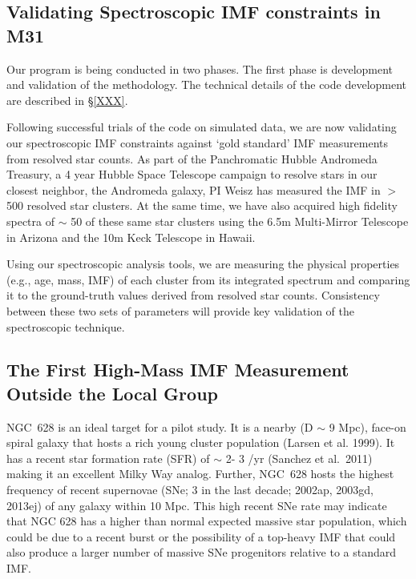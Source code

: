 \documentclass[11pt,preprint]{aastex}
\begin{document}
\subsection{Validating Spectroscopic IMF constraints in M31}

Our program is being conducted in two phases.  The first phase is development and validation of the methodology.  The technical details of the code development are described in \S \ref{XXX}.  

Following successful trials of the code on simulated data, we are now validating our spectroscopic IMF constraints against `gold standard' IMF measurements from resolved star counts.  As part of the Panchromatic Hubble Andromeda Treasury, a 4 year Hubble Space Telescope campaign to resolve stars in our closest neighbor, the Andromeda galaxy, PI Weisz has measured the IMF in $>$500 resolved star clusters.  At the same time, we have also acquired high fidelity spectra of $\sim$ 50 of these same star clusters using the 6.5m Multi-Mirror Telescope in Arizona and the 10m Keck Telescope in Hawaii.  

Using our spectroscopic analysis tools, we are measuring the physical properties (e.g., age, mass, IMF) of each cluster from its integrated spectrum and comparing it to the ground-truth values derived from resolved star counts.  Consistency between these two sets of parameters will provide key validation of the spectroscopic technique. 





\subsection{The First High-Mass IMF Measurement Outside the Local Group}

NGC~628 is an ideal target for a pilot study.  It is a nearby (D $\sim$ 9 Mpc), face-on spiral galaxy that hosts a rich young cluster population (Larsen et al. 1999). It has a recent star formation rate (SFR) of $\sim$ 2- 3 \msun /yr (Sanchez et al.\ 2011) making it an excellent Milky Way analog.  Further, NGC~628 hosts the highest frequency of recent supernovae (SNe; 3 in the last decade;  2002ap, 2003gd, 2013ej) of any galaxy within 10 Mpc.  This high recent SNe rate may indicate that NGC 628 has a higher than normal expected massive star population, which could be due to a recent burst or the possibility of a top-heavy IMF that could also produce a larger number of massive SNe progenitors relative to a standard IMF.
\end{document}

